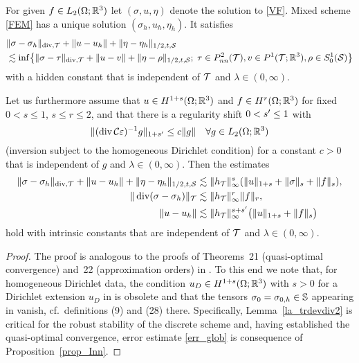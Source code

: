 \documentclass[11pt]{article}
\begin{document}
\begin{theorem} \label{thm_Cea}
For given $f\in L_2(\Omega;\mathbb{R}^3)$ let $(\sigma,u,\eta)$ denote the solution to \eqref{VF}.
Mixed scheme \eqref{FEM} has a unique solution $(\sigma_h,u_h,\eta_h)$. It satisfies
\begin{align*}
   &\|\sigma-\sigma_h\|_{\operatorname{div},\mathcal{T}} + \|u-u_h\| + \|\eta-\eta_h\|_{1/2,t,\mathcal{S}}\nonumber\\
   &\lesssim
   \inf\bigl\{
   \|\sigma-\tau\|_{\operatorname{div},\mathcal{T}} + \|u-v\| + \|\eta-\rho\|_{1/2,t,\mathcal{S}};\;
   \tau\in P^2_{nn}(\mathcal{T}), v\in P^1(\mathcal{T};\mathbb{R}^3), \rho\in S^1_0(\mathcal{S}) \bigr\}
\end{align*}
with a hidden constant that is independent of $\mathcal{T}$ and $\lambda\in (0,\infty)$.

Let us furthermore assume that $u\in H^{1+s}(\Omega;\mathbb{R}^3)$ and $f\in H^r(\Omega;\mathbb{R}^3)$
for fixed $0<s\le 1$, $s\le r\le 2$, and
that there is a regularity shift $0<{s'}\le 1$ with
\[
   \|(\operatorname{div}\mathcal{C}\varepsilon)^{-1}g\|_{1+{s'}}\le c\|g\|\quad\forall g\in L_2(\Omega;\mathbb{R}^3)
\]
(inversion subject to the homogeneous Dirichlet condition) for a constant $c>0$
that is independent of $g$ and $\lambda\in (0,\infty)$.
Then the estimates
\begin{align} \label{err_glob}
   \|\sigma-\sigma_h\|_{\operatorname{div},\mathcal{T}} + \|u-u_h\| + \|\eta-\eta_h\|_{1/2,t,\mathcal{S}}
   &\lesssim
   \|h_{\mathcal{T}}\|_{\infty}^s (\|u\|_{1+s} + \|\sigma\|_s + \|f\|_s),\\
   \|\operatorname{div}(\sigma-\sigma_h)\|_{\mathcal{T}} &\lesssim \|h_{\mathcal{T}}\|_{\infty}^r \|f\|_r, \nonumber\\
   \|u-u_h\| &\lesssim
   \|h_{\mathcal{T}}\|_\infty^{s+{s'}} \bigl(\|u\|_{1+s} + \|f\|_s\bigr) \nonumber
\end{align}
hold with intrinsic constants that are independent of $\mathcal{T}$ and $\lambda\in(0,\infty)$.
\end{theorem}

\begin{proof}
The proof is analogous to the proofs of Theorems~21 (quasi-optimal convergence)
and~22 (approximation orders) in \cite{CarstensenH_NNC}.
To this end we note that, for homogeneous Dirichlet data,
the condition $u_D\in H^{1+s}(\Omega;\mathbb{R}^3)$ with $s>0$ for a Dirichlet extension
$u_D$ in \cite[Theorem~21]{CarstensenH_NNC} is obsolete
and that the tensors $\sigma_0=\sigma_{0,h}\in\mathbb{S}$ appearing in
\cite[Theorem~22]{CarstensenH_NNC} vanish, cf.~definitions (9) and (28) there.
Specifically, Lemma~\ref{la_trdevdiv2} is critical for the robust stability of the
discrete scheme and, having established the quasi-optimal convergence,
error estimate \eqref{err_glob} is consequence of Proposition~\ref{prop_Inn}.
\end{proof}
\end{document}
